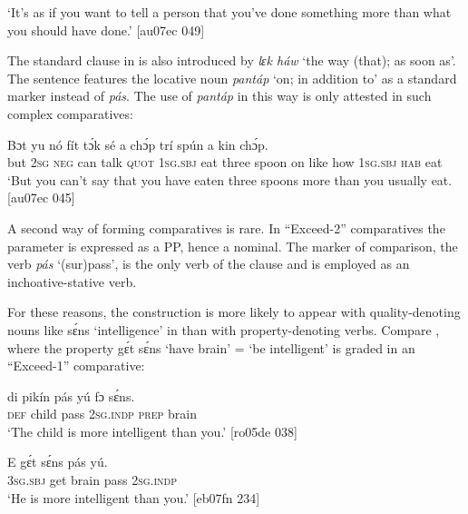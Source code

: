 \glt ‘It’s as if you want to tell a person that you’ve done something more 
than what you should have done.’ [au07ec 049]
\z

The standard clause in  is also introduced by \textit{lɛk háw} ‘the way (that); as soon as’. The sentence features the locative noun \textit{pantáp} ‘on; in addition to’ as a standard marker instead of \textit{pás}. The use of \textit{pantáp} in this way is only attested in such complex comparatives: 


\ea%
    \label{ex:key:482}
    \gll Bɔt  yu  nó  fít  tɔ́k  sé    a    chɔ́p  trí    spún
       a    kin  chɔ́p.\\
but  \textsc{2sg}  \textsc{neg}  can  talk  \textsc{quot}    \textsc{1sg.sbj}  eat    three  spoon
on    like  how    \textsc{1sg.sbj}  \textsc{hab}  eat\\

\glt ‘But you can’t say that you have eaten three spoons more than you
usually eat. [au07ec 045]
\z

A second way of forming comparatives is rare. In “Exceed-2” comparatives \citep{Stassen1985} the parameter is expressed as a PP, hence a nominal. The marker of comparison, the verb \textit{pás} ‘(sur)pass’, is the only verb of the clause and is employed as an inchoative-stative verb. 


For these reasons, the construction is more likely to appear with quality-denoting nouns like sɛ́ns ‘intelligence’ in  than with property-denoting verbs. Compare , where the property gɛ́t sɛ́ns ‘have brain’ = ‘be intelligent’ is graded in an “Exceed-1” comparative:



\ea%
    \label{ex:key:483}
    \gll di  pikín  pás    yú    fɔ  sɛ́ns.\\
\textsc{def}  child  pass    \textsc{2sg.indp}  \textsc{prep}  brain\\

\glt ‘The child is more intelligent than you.’ [ro05de 038]
\z


\ea%
    \label{ex:key:484}
    \gll E    gɛ́t  sɛ́ns    pás    yú.\\
\textsc{3sg.sbj}  get   brain  pass    \textsc{2sg.indp}\\

\glt ‘He is more intelligent than you.’ [eb07fn 234]
\z

